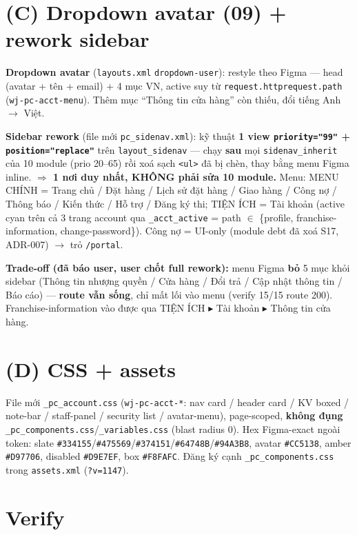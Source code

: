 \section{(C) Dropdown avatar (09) + rework sidebar}

\textbf{Dropdown avatar} (\texttt{layouts.xml} \texttt{dropdown-user}): restyle theo Figma --- head (avatar + tên + email) + 4 mục VN, active suy từ \texttt{request.httprequest.path} (\texttt{wj-pc-acct-menu}). Thêm mục ``Thông tin cửa hàng'' còn thiếu, đổi tiếng Anh $\rightarrow$ Việt.

\textbf{Sidebar rework} (file mới \texttt{pc\_sidenav.xml}): kỹ thuật \textbf{1 view \texttt{priority="99"} + \texttt{position="replace"}} trên \texttt{layout\_sidenav} --- chạy \textbf{sau} mọi \texttt{sidenav\_inherit} của 10 module (prio 20--65) rồi xoá sạch \texttt{<ul>} đã bị chèn, thay bằng menu Figma inline. \textbf{$\Rightarrow$ 1 nơi duy nhất, KHÔNG phải sửa 10 module.} Menu: MENU CHÍNH = Trang chủ / Đặt hàng / Lịch sử đặt hàng / Giao hàng / Công nợ / Thông báo / Kiến thức / Hỗ trợ / Đăng ký thi; TIỆN ÍCH = Tài khoản (active cyan trên cả 3 trang account qua \texttt{\_acct\_active} = path $\in$ \{profile, franchise-information, change-password\}). Công nợ = UI-only (module debt đã xoá S17, ADR-007) $\rightarrow$ trỏ \texttt{/portal}.

\textbf{Trade-off (đã báo user, user chốt full rework):} menu Figma \textbf{bỏ} 5 mục khỏi sidebar (Thông tin nhượng quyền / Cửa hàng / Đổi trả / Cập nhật thông tin / Báo cáo) --- \textbf{route vẫn sống}, chỉ mất lối vào menu (verify 15/15 route 200). Franchise-information vào được qua TIỆN ÍCH ▸ Tài khoản ▸ Thông tin cửa hàng.

\section{(D) CSS + assets}

File mới \texttt{\_pc\_account.css} (\texttt{wj-pc-acct-*}: nav card / header card / KV boxed / note-bar / staff-panel / security list / avatar-menu), page-scoped, \textbf{không đụng} \texttt{\_pc\_components.css}/\texttt{\_variables.css} (blast radius 0). Hex Figma-exact ngoài token: slate \texttt{\#334155}/\texttt{\#475569}/\texttt{\#374151}/\texttt{\#64748B}/\texttt{\#94A3B8}, avatar \texttt{\#CC5138}, amber \texttt{\#D97706}, disabled \texttt{\#D9E7EF}, box \texttt{\#F8FAFC}. Đăng ký cạnh \texttt{\_pc\_components.css} trong \texttt{assets.xml} (\texttt{?v=1147}).

\section{Verify}

